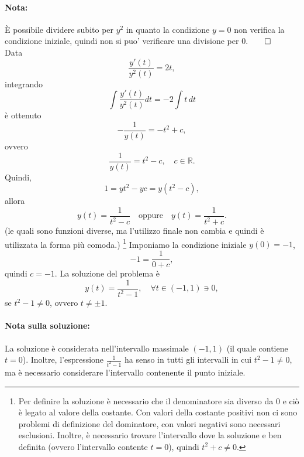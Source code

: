\begin{example}
    \paragraph{Nota:} È possibile dividere subito per $y^2$ in quanto la condizione $y=0$ non verifica la condizione iniziale, quindi non si puo' verificare una divisione per 0.$\qed$\\
    Data
    \begin{equation*}
    	\frac{y'(t)}{y^2(t)}=2t,
    \end{equation*}
    integrando
    \begin{equation*}
    	\int\frac{y'(t)}{y^2(t)}dt=-2\int t\, dt
    \end{equation*}
    è ottenuto
    \begin{equation*}
    	-\frac{1}{y(t)} = -t^2+c,
    \end{equation*}
    ovvero
    \begin{equation*}
	\frac{1}{y(t)} = t^2-c,\quad c\in\mathbb{R}.
    \end{equation*}
    Quindi,
    \begin{equation*}
        1 = y t^2 - yc = y(t^2-c),
    \end{equation*}
    allora
    \begin{equation*}
        y(t) = \frac{1}{t^2-c}\quad\text{oppure}\quad y(t) = \frac{1}{t^2+c}.
    \end{equation*}
    (le quali sono funzioni diverse, ma l'utilizzo finale non cambia e quindi è utilizzata la forma più comoda.)
    \footnote{Per definire la soluzione è necessario che il denominatore sia diverso da 0 e ciò è legato al valore della costante. Con valori della costante positivi non ci sono problemi di definizione del dominatore, con valori negativi sono necessari esclusioni. Inoltre, è necessario trovare l'intervallo dove la soluzione e ben definita (ovvero l'intervallo contente $t=0$), quindi $t^2+c\neq 0$.}
    Imponiamo la condizione iniziale $y(0) = -1$,
    \begin{equation*}
        -1=\frac{1}{0+c},
    \end{equation*}
    quindi $c=-1$. La soluzione del problema è
    \begin{equation*}
        y(t) = \frac{1}{t^2 -1},\quad \forall t\in(-1,1)\ni 0,
    \end{equation*}
    se $t^2 -1\neq 0$, ovvero $t\neq \pm 1$.
    \paragraph{Nota sulla soluzione:} La soluzione è considerata nell'intervallo massimale $(-1, 1)$ (il quale contiene $t=0$). Inoltre, l'espressione $\frac{1}{t^2 -1}$ ha senso in tutti gli intervalli in cui $t^2-1\neq 0$, ma è necessario considerare l'intervallo contenente il punto iniziale.
\end{example}

